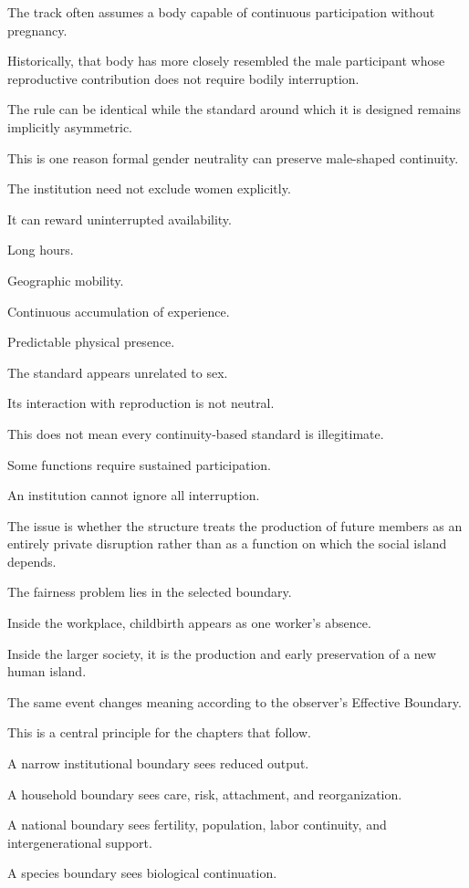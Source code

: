 The track often assumes a body capable of continuous participation without pregnancy.

Historically, that body has more closely resembled the male participant whose reproductive contribution does not require bodily interruption.

The rule can be identical while the standard around which it is designed remains implicitly asymmetric.

This is one reason formal gender neutrality can preserve male-shaped continuity.

The institution need not exclude women explicitly.

It can reward uninterrupted availability.

Long hours.

Geographic mobility.

Continuous accumulation of experience.

Predictable physical presence.

The standard appears unrelated to sex.

Its interaction with reproduction is not neutral.

This does not mean every continuity-based standard is illegitimate.

Some functions require sustained participation.

An institution cannot ignore all interruption.

The issue is whether the structure treats the production of future members as an entirely private disruption rather than as a function on which the social island depends.

The fairness problem lies in the selected boundary.

Inside the workplace, childbirth appears as one worker’s absence.

Inside the larger society, it is the production and early preservation of a new human island.

The same event changes meaning according to the observer’s Effective Boundary.

This is a central principle for the chapters that follow.

A narrow institutional boundary sees reduced output.

A household boundary sees care, risk, attachment, and reorganization.

A national boundary sees fertility, population, labor continuity, and intergenerational support.

A species boundary sees biological continuation.

